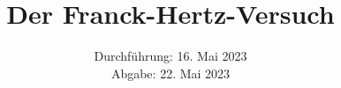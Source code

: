 

\subject{\texorpdfstring{\vspace{2ex}}{}V601\texorpdfstring{\vspace{-2ex}}{}} %
\title{Der Franck-Hertz-Versuch} %
\date{
	Durchführung: 16. Mai 2023 %
	\\ Abgabe: 22. Mai 2023 %
}




\maketitle
\thispagestyle{empty}


\tableofcontents
\newpage







\printbibliography{}

\newpage



